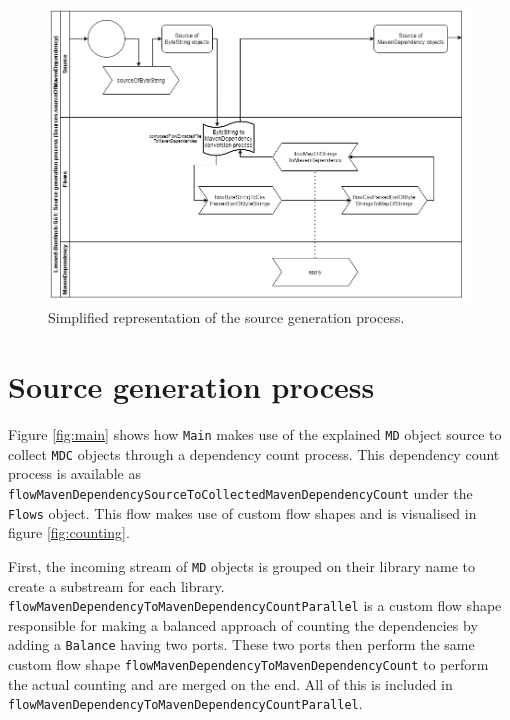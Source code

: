 \begin{figure}[H]
    \centering
    \includegraphics[width=0.85\linewidth]{images/source.png}
    \captionsetup{width=0.8\linewidth}
    \captionsetup{justification=centering}
    \caption{Simplified representation of the source generation process.  }
    \label{fig:source}
\end{figure}





\section{Source generation process}
\label{sec:source_gen_proc}

Figure \ref{fig:main} shows how \texttt{Main} makes use of the explained \texttt{MD} object source to collect \texttt{MDC} objects through a dependency count process.
This dependency count process is available as \texttt{flowMavenDependencySource\-ToCollectedMavenDependencyCount} under the \texttt{Flows} object.
This flow makes use of custom flow shapes and is visualised in figure \ref{fig:counting}.

First, the incoming stream of \texttt{MD} objects is grouped on their library name to create a substream for each library.
\texttt{flowMavenDependency\-ToMavenDependencyCount\-Parallel} is a custom flow shape responsible for making a balanced approach of counting the dependencies by adding a \texttt{Balance\-[MavenDependency]} having two ports.
These two ports then perform the same custom flow shape \texttt{flowMavenDependencyToMavenDependencyCount} to perform the actual counting and are merged on the end.
All of this is included in \texttt{flow\-Maven\-Dependency\-To\-Maven\-Dependency\-Count\-Parallel}.

